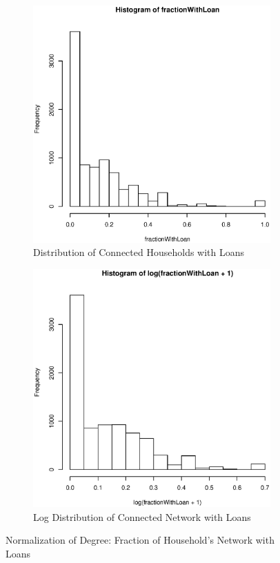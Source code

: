 \documentclass[11pt, fleqn]{article}
\begin{document}
\begin{figure}
  \centering
  \begin{subfigure}[b]{0.49\textwidth}
    \includegraphics[width=\textwidth]{degrees_frac_with_loan.eps}
    \caption{Distribution of Connected Households with Loans}
    \label{fig:frac_loan}
  \end{subfigure}
  \hfill
  \begin{subfigure}[b]{0.49\textwidth}
    \includegraphics[width=\textwidth]{degrees_frac_with_loan_log.eps}
    \caption{Log Distribution of Connected Network with Loans}
    \label{fig:log_frac_loan}
  \end{subfigure}
  \caption{Normalization of Degree: Fraction of Household's Network with Loans}
\end{figure}
\end{document}

